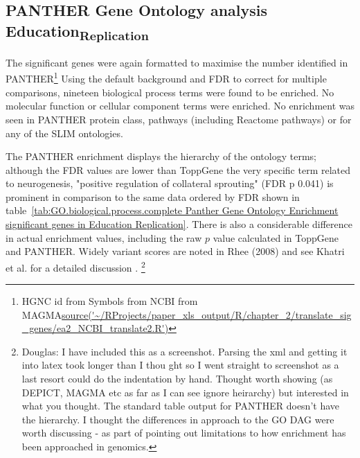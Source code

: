  \subsection{PANTHER Gene Ontology analysis Education\textsubscript{Replication}}
 
 The significant genes were again formatted to maximise the number identified in PANTHER\footnote{HGNC id from Symbols from NCBI from MAGMA\url{source('~/RProjects/paper_xls_output/R/chapter_2/translate_sig_genes/ea2_NCBI_translate2.R')}}
 Using the default background and FDR to correct for multiple comparisons, nineteen biological process terms were found to be enriched. No molecular function or cellular component terms were enriched. No enrichment was seen in PANTHER protein class, pathways (including Reactome pathways) or for any of the SLIM ontologies. 
 
 
 
 
     
     
 
 The PANTHER enrichment displays the hierarchy of the ontology terms; although the FDR values are lower than ToppGene the very specific term related to neurogenesis, "positive regulation of collateral sprouting" (FDR p 0.041) is prominent in comparison to the same data ordered by FDR shown in table~\ref{tab:GO.biological.process.complete Panther Gene Ontology Enrichment significant genes in Education Replication}. There is also a considerable difference in actual enrichment values, including the raw $p$ value calculated in ToppGene and PANTHER. Widely variant scores are noted in Rhee (2008) \cite{rhee2008use} and see Khatri et al. for a detailed discussion \cite{khatri2005ontological}.
 \footnote{Douglas: I have included this as a screenshot. Parsing the xml and getting it into latex took longer than I thou
 ght so I went straight to screenshot as a last resort could do the indentation by hand. Thought worth showing (as DEPICT, MAGMA etc as far as I can see ignore heirarchy) but interested in what you thought. The standard table output for PANTHER doesn't have the hierarchy. I thought the differences in approach to the GO DAG were worth discussing  - as part of pointing out limitations to how enrichment has been approached in genomics. }
 
